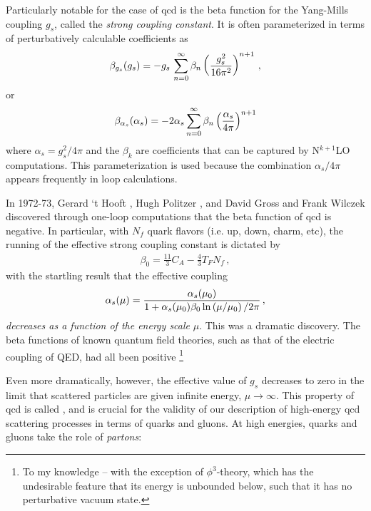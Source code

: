 Particularly notable for the case of \gls{qcd} is the beta function for the Yang-Mills coupling \(g_s\), called the \textit{strong coupling constant}.
%
It is often parameterized in terms of perturbatively calculable coefficients as
\begin{align}
    \beta_{g_s}(g_s)
    =
    -g_s\,
    \sum_{n=0}^\infty \beta_n \left(\frac{g_s^2}{16\pi^2}\right)^{n+1}
    \,,
\end{align}
or
\begin{align}
    \beta_{\alpha_s}(\alpha_s)
    =
    -2\alpha_s
    \sum_{n=0}^\infty \beta_n \left(\frac{\alpha_s}{4\pi}\right)^{n+1}
\end{align}
where \(\alpha_s = g_s^2 / 4 \pi\) and the \(\beta_k\) are coefficients that can be captured by N\(^{k+1}\)LO computations.
%
This parameterization is used because the combination \(\alpha_s / 4\pi\) appears frequently in loop calculations.

In 1972-73, Gerard `t Hooft \cite{tHooft:1998qmr}, Hugh Politzer \cite{Politzer:1973fx}, and David Gross and Frank Wilczek \cite{Gross:1973ju} discovered through one-loop computations that the beta function of \gls{qcd} is negative.
%
In particular, with \(N_f\) quark flavors (i.e. up, down, charm, etc), the  running of the effective strong coupling constant is dictated by
\begin{align}
    \beta_0 = \frac{11}{3} C_A - \frac{4}{3} T_F N_f
    \,,
\end{align}
with the startling result that the effective coupling
\begin{align}
    \alpha_s(\mu)
    =
    \frac{\alpha_s(\mu_0)}{1 + \alpha_s(\mu_0) \beta_0 \ln\left(\mu / \mu_0\right)/2\pi}
    \,,
\end{align}
\textit{decreases as a function of the energy scale} \(\mu\).
%
This was a dramatic discovery.
%
The beta functions of known quantum field theories, such as that of the electric coupling of QED, had all been positive%
\footnote{
    To my knowledge -- with the exception of \(\phi^3\)-theory, which has the undesirable feature that its energy is unbounded below, such that it has no perturbative vacuum state.
}

Even more dramatically, however, the effective value of \(g_s\) decreases to zero in the limit that scattered particles are given infinite energy, \(\mu \to \infty\).
%
This property of \gls{qcd} is called , and is crucial for the validity of our description of high-energy \gls{qcd} scattering processes in terms of quarks and gluons.
%
At high energies, quarks and gluons take the role of \textit{partons}:

